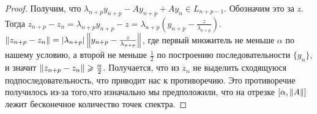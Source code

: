 \documentclass{article}
\begin{document}
\begin{proof}
    Получим, что $\lambda_{n+p} y_{n+p} - Ay_{n+p} + Ay_{n} \in L_{n+p-1}$. Обозначим это за $z$. Тогда $z_{n+p} - z_{n} = \lambda_{n+p}y_{n+p} - z = \lambda_{n+p}(y_{n+p} - \frac{z}{\lambda_{n+p}})$. $\left\|z_{n+p} - z_{n}\right\| = \left|\lambda_{n+p}\right|\left\|y_{n+p} - \frac{z}{\lambda_{n+p}}\right\|$, где первый множитель не меньше $\alpha$ по нашему условию, а второй не меньше $\frac{1}{2}$ по построению последовательности $\{y_n\}$, и значит $\left\|z_{n+p} - z_{n}\right\| \geqslant \frac{\alpha}{2}$. Получается, что из $z_n$ не выделить сходящуюся подпоследовательность, что приводит нас к противоречию. Это противоречие получилось из-за того,что изначально мы предположили, что на отрезке $[\alpha,  \left\|A\right\|]$ лежит бесконечное количество точек спектра. 


\end{proof}
\end{document}
